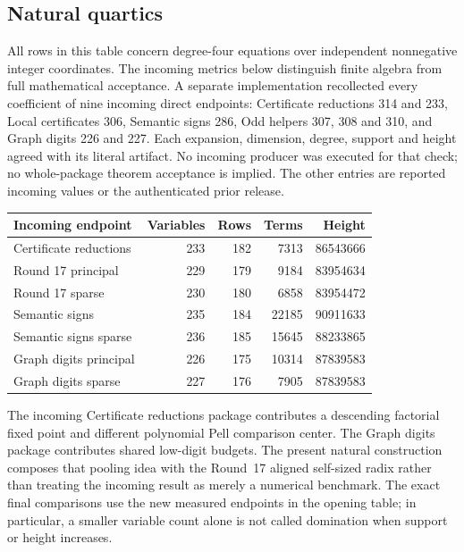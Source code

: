 \subsection{Natural quartics}
All rows in this table concern degree-four equations over independent
nonnegative integer coordinates. The incoming metrics below distinguish finite algebra from full mathematical
acceptance. A separate implementation recollected every coefficient of nine
incoming direct endpoints: Certificate reductions 314 and 233, Local
certificates 306, Semantic signs 286, Odd helpers 307, 308 and 310, and
Graph digits 226 and 227. Each expansion, dimension, degree, support and
height agreed with its literal artifact. No incoming producer was executed
for that check; no whole-package theorem acceptance is implied. The other
entries are reported incoming values or the authenticated prior release.
\begin{center}\small
\begin{tabular}{@{}lrrrr@{}}\toprule
Incoming endpoint & Variables & Rows & Terms & Height\\\midrule
Certificate reductions & 233 & 182 & 7313 & 86543666\\
Round 17 principal & 229 & 179 & 9184 & 83954634\\
Round 17 sparse & 230 & 180 & 6858 & 83954472\\
Semantic signs & 235 & 184 & 22185 & 90911633\\
Semantic signs sparse & 236 & 185 & 15645 & 88233865\\
Graph digits principal & 226 & 175 & 10314 & 87839583\\
Graph digits sparse & 227 & 176 & 7905 & 87839583\\\bottomrule
\end{tabular}
\end{center}
The incoming Certificate reductions package contributes a descending
factorial fixed point and different polynomial Pell comparison center.
The Graph digits package contributes shared low-digit budgets. The present
natural construction composes that pooling idea with the Round~17 aligned
self-sized radix rather than treating the incoming result as merely a
numerical benchmark. The exact final comparisons use the new measured
endpoints in the opening table; in particular, a smaller variable count
alone is not called domination when support or height increases.

